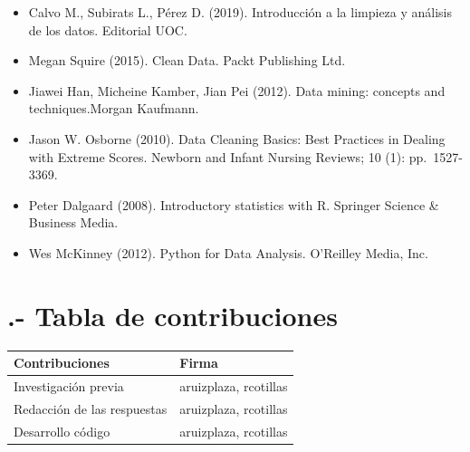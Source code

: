 \documentclass[
]{article}
\providecommand{\tightlist}{%
  \setlength{\itemsep}{0pt}\setlength{\parskip}{0pt}}
\begin{document}
\begin{itemize}
\tightlist
\item
  Calvo M., Subirats L., Pérez D. (2019). Introducción a la limpieza y
  análisis de los datos. Editorial UOC.
\item
  Megan Squire (2015). Clean Data. Packt Publishing Ltd.
\item
  Jiawei Han, Micheine Kamber, Jian Pei (2012). Data mining: concepts
  and techniques.Morgan Kaufmann.
\item
  Jason W. Osborne (2010). Data Cleaning Basics: Best Practices in
  Dealing with Extreme Scores. Newborn and Infant Nursing Reviews; 10
  (1): pp.~1527-3369.
\item
  Peter Dalgaard (2008). Introductory statistics with R. Springer
  Science \& Business Media.
\item
  Wes McKinney (2012). Python for Data Analysis. O'Reilley Media, Inc.
\end{itemize}

\hypertarget{tabla-de-contribuciones}{%
\section{.- Tabla de contribuciones}\label{tabla-de-contribuciones}}

\begin{longtable}[]{@{}ll@{}}
\toprule
Contribuciones & Firma\tabularnewline
\midrule
\endhead
Investigación previa & aruizplaza, rcotillas\tabularnewline
Redacción de las respuestas & aruizplaza, rcotillas\tabularnewline
Desarrollo código & aruizplaza, rcotillas\tabularnewline
\bottomrule
\end{longtable}
\end{document}
